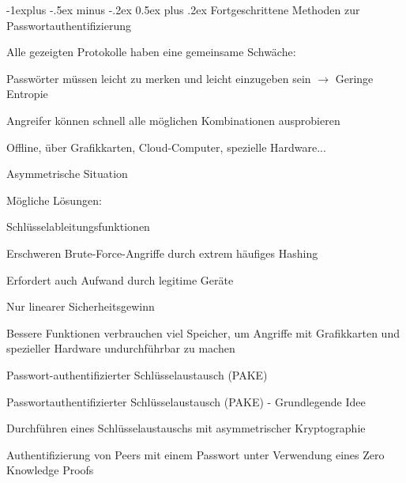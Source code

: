 \documentclass[a4paper]{article}
\makeatletter
\renewcommand{\subsection}{\@startsection{subsection}{2}{0mm}%
 {-1explus -.5ex minus -.2ex}%
 {0.5ex plus .2ex}%
 {\normalfont\normalsize\bfseries}}
\makeatother
\begin{document}
\begin{multicols}{3}
      \subsection{Fortgeschrittene Methoden zur Passwortauthentifizierung}
      \begin{itemize*}
            \item Alle gezeigten Protokolle haben eine gemeinsame Schwäche:
            \begin{itemize*}
                  \item Passwörter müssen leicht zu merken und leicht einzugeben sein $\rightarrow$ Geringe Entropie
                  \item Angreifer können schnell alle möglichen Kombinationen ausprobieren
                  \item Offline, über Grafikkarten, Cloud-Computer, spezielle Hardware...
                  \item Asymmetrische Situation
            \end{itemize*}
            \item Mögliche Lösungen:
            \begin{itemize*}
                  \item Schlüsselableitungsfunktionen
                  \begin{itemize*}
                        \item Erschweren Brute-Force-Angriffe durch extrem häufiges Hashing
                        \item Erfordert auch Aufwand durch legitime Geräte
                        \item Nur linearer Sicherheitsgewinn
                        \item Bessere Funktionen verbrauchen viel Speicher, um Angriffe mit Grafikkarten und spezieller Hardware undurchführbar zu machen
                  \end{itemize*}
                  \item Passwort-authentifizierter Schlüsselaustausch (PAKE)
            \end{itemize*}
            \item Passwortauthentifizierter Schlüsselaustausch (PAKE) - Grundlegende Idee
            \begin{itemize*}
                  \item Durchführen eines Schlüsselaustauschs mit asymmetrischer Kryptographie
                  \item Authentifizierung von Peers mit einem Passwort unter Verwendung eines Zero Knowledge Proofs

\end{itemize*}
\end{itemize*}
\end{multicols}
\end{document}
